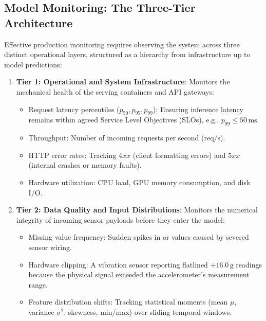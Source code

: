 \subsection{Model Monitoring: The Three-Tier Architecture}\label{subsec:monitoring}

Effective production monitoring requires observing the system across three distinct operational layers, structured as a hierarchy from infrastructure up to model predictions:

\begin{enumerate}
    \item \textbf{Tier 1: Operational and System Infrastructure}:
    Monitors the mechanical health of the serving containers and API gateways:
    \begin{itemize}
        \item Request latency percentiles ($p_{50}, p_{95}, p_{99}$): Ensuring inference latency remains within agreed Service Level Objectives (SLOs), e.g., $p_{99} \le 50\,\text{ms}$.
        \item Throughput: Number of incoming requests per second ($\text{req/s}$).
        \item HTTP error rates: Tracking $4xx$ (client formatting errors) and $5xx$ (internal crashes or memory faults).
        \item Hardware utilization: CPU load, GPU memory consumption, and disk I/O.
    \end{itemize}

    \item \textbf{Tier 2: Data Quality and Input Distributions}:
    Monitors the numerical integrity of incoming sensor payloads before they enter the model:
    \begin{itemize}
        \item Missing value frequency: Sudden spikes in  or  values caused by severed sensor wiring.
        \item Hardware clipping: A vibration sensor reporting flatlined $+16.0\,\text{g}$ readings because the physical signal exceeded the accelerometer's measurement range.
        \item Feature distribution shifts: Tracking statistical moments (mean $\mu$, variance $\sigma^2$, skewness, min/max) over sliding temporal windows.
    \end{itemize}


\end{enumerate}
